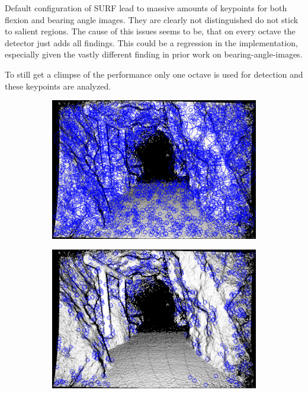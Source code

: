 Default configuration of SURF lead to massive amounts of keypoints for both flexion and bearing angle images.
They are clearly not distinguished do not stick to salient regions.
The cause of this issues seems to be, that on every octave the detector just adds all findings.
This could be a regression in the implementation, especially given the vastly different finding in prior work on \glspl{bearing-angle-image}.

To still get a climpse of the performance only one octave is used for detection and these keypoints are analyzed.
\begin{figure}[H]
\begin{subfigure}[t]{0.25\linewidth}
    \includegraphics[width=\linewidth]{chapter06/results/SURF/flexion/default_kp0005.png}%
\end{subfigure}%
\begin{subfigure}[t]{0.25\linewidth}
    \includegraphics[width=\linewidth]{chapter06/results/SURF/flexion/oneoctave_kp0005.png}%

\end{subfigure}
\end{figure}
